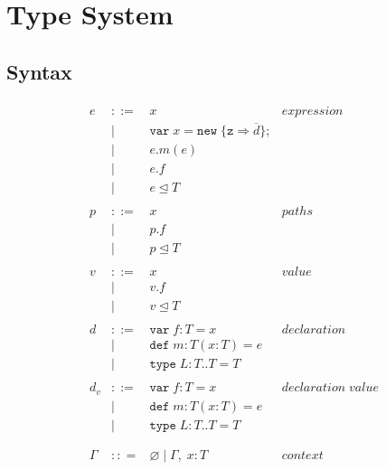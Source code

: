 \documentclass{llncs}
\begin{document}
\section{Type System}
	\label{s:type_sys}


\subsection{Syntax}


\begin{figure}[h]
\[
\begin{array}{lll}
\begin{array}{lllr}
e & ::= & x & expression \\
& | & \texttt{var} \; x = \texttt{new} \; \{\texttt{z} \Rightarrow \overline{d}\};&\\
& | & e.m(e) &\\
& | & e.f &\\
& | & e \unlhd T&\\
&&\\
p & ::= & x & paths \\
& | & p.f &\\
& | & p \unlhd T &\\
&&\\
v & ::= & x & value \\
& | & v.f &\\
& | & v \unlhd T &\\
&&\\
d & ::= & \texttt{var} \; f : T = x & declaration \\
  & |   & \texttt{def} \; m : T(x:T) = e &\\
  & |   & \texttt{type} \; L : T .. T = T &\\
&&\\
d_v & ::= & \texttt{var} \; f : T = x & declaration \; value \\
  & |   & \texttt{def} \; m : T(x:T) = e &\\
  & |   & \texttt{type} \; L : T .. T = T &\\
&&\\
&&\\
\Gamma & :: = & \varnothing \; | \; \Gamma, \; x : T & context \\

\end{array}
\end{array}\]
\end{figure}
\end{document}
